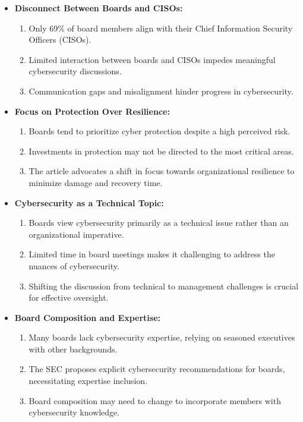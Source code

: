 \documentclass{article}
\begin{document}
\begin{itemize}
  \item \textbf{Disconnect Between Boards and CISOs:}
        \begin{enumerate}
          \item Only 69\% of board members align with their Chief Information Security Officers (CISOs).
          \item Limited interaction between boards and CISOs impedes meaningful cybersecurity discussions.
          \item Communication gaps and misalignment hinder progress in cybersecurity.
        \end{enumerate}
        
  \item \textbf{Focus on Protection Over Resilience:}
        \begin{enumerate}
          \item Boards tend to prioritize cyber protection despite a high perceived risk.
          \item Investments in protection may not be directed to the most critical areas.
          \item The article advocates a shift in focus towards organizational resilience to minimize damage and recovery time.
        \end{enumerate}
        
  \item \textbf{Cybersecurity as a Technical Topic:}
        \begin{enumerate}
          \item Boards view cybersecurity primarily as a technical issue rather than an organizational imperative.
          \item Limited time in board meetings makes it challenging to address the nuances of cybersecurity.
          \item Shifting the discussion from technical to management challenges is crucial for effective oversight.
        \end{enumerate}
        
  \item \textbf{Board Composition and Expertise:}
        \begin{enumerate}
          \item Many boards lack cybersecurity expertise, relying on seasoned executives with other backgrounds.
          \item The SEC proposes explicit cybersecurity recommendations for boards, necessitating expertise inclusion.
          \item Board composition may need to change to incorporate members with cybersecurity knowledge.
        \end{enumerate}
        

\end{itemize}
\end{document}
